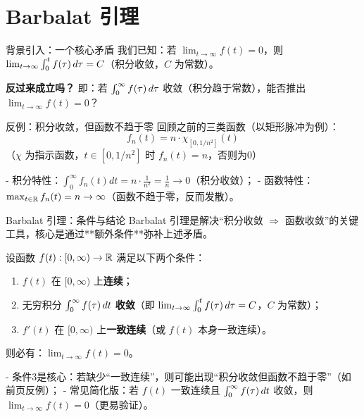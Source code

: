 \section{Barbalat 引理}
\begin{frame}{背景引入：一个核心矛盾}
  我们已知：若 $\lim_{t \to \infty} f(t) = 0$，则 $\lim_{t \to \infty} \int_{0}^{t} f(\tau) \, d\tau = C$（积分收敛，$C$ 为常数）。
  
  \vspace{0.5cm}
  \textbf{反过来成立吗？}  
  即：若 $\int_{0}^{\infty} f(\tau) \, d\tau$ 收敛（积分趋于常数），能否推出 $\lim_{t \to \infty} f(t) = 0$？

  \vspace{0.8cm}
  \begin{block}{反例：积分收敛，但函数不趋于零}
    回顾之前的三类函数（以矩形脉冲为例）：
    \[ f_n(t) = n \cdot \chi_{[0, 1/n^2]}(t) \]
    （$\chi$ 为指示函数，$t \in [0,1/n^2]$ 时 $f_n(t)=n$，否则为0）
    
    - 积分特性：$\int_0^\infty f_n(t)dt = n \cdot \frac{1}{n^2} = \frac{1}{n} \to 0$（积分收敛）；
    - 函数特性：$\max_{t \in \mathbb{R}} f_n(t) = n \to \infty$（函数不趋于零，反而发散）。
  \end{block}
\end{frame}

\begin{frame}{Barbalat 引理：条件与结论}
  Barbalat 引理是解决“积分收敛 $\Rightarrow$ 函数收敛”的关键工具，核心是通过**额外条件**弥补上述矛盾。

  \vspace{0.5cm}
  \begin{theorem}[经典 Barbalat 引理]
    设函数 $f(t): [0, \infty) \to \mathbb{R}$ 满足以下两个条件：
    \begin{enumerate}
      \item $f(t)$ 在 $[0, \infty)$ 上\textbf{连续}；
      \item 无穷积分 $\int_{0}^{\infty} f(\tau) \, dt$ \textbf{收敛}（即 $\lim_{t \to \infty} \int_{0}^{t} f(\tau) \, d\tau = C$，$C$ 为常数）；
      \item $f'(t)$ 在 $[0, \infty)$ 上\textbf{一致连续}（或 $f(t)$ 本身一致连续）。
    \end{enumerate}
    则必有：$\boxed{\lim_{t \to \infty} f(t) = 0}$。
  \end{theorem}

  \vspace{0.3cm}
  \begin{remark}
    - 条件3是核心：若缺少“一致连续”，则可能出现“积分收敛但函数不趋于零”（如前页反例）；
    - 常见简化版：若 $f(t)$ 一致连续且 $\int_{0}^{\infty} f(\tau) \, dt$ 收敛，则 $\lim_{t \to \infty} f(t) = 0$（更易验证）。
  \end{remark}
\end{frame}

